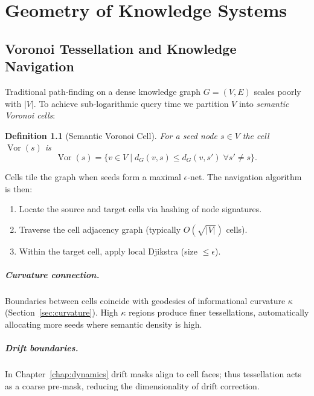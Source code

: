 
\newtheorem{definition}{Definition}[section]
\chapter{Geometry of Knowledge Systems}\label{chap:geometry}
\section{Voronoi Tessellation and Knowledge Navigation}\label{sec:tessellation}

Traditional path‑finding on a dense knowledge graph $G=(V,E)$ scales poorly with $|V|$.
To achieve sub‑logarithmic query time we partition $V$ into \emph{semantic Voronoi cells}:
\begin{definition}[Semantic Voronoi Cell]
For a seed node $s\in V$ the cell $\operatorname{Vor}(s)$ is
\[
  \operatorname{Vor}(s)=\{v\in V\mid d_G(v,s)\le d_G(v,s')\;\forall s'\neq s\}.\,
\]
\end{definition}
Cells tile the graph when seeds form a maximal $\epsilon$‑net.  The navigation algorithm is then:
\begin{enumerate}
  \item Locate the source and target cells via hashing of node signatures.
  \item Traverse the cell adjacency graph (typically \(O(\sqrt{|V|})\) cells).
  \item Within the target cell, apply local Djikstra (size $\le\epsilon$).
\end{enumerate}

\paragraph{Curvature connection.}  Boundaries between cells coincide with geodesics of
informational curvature $\kappa$ (Section~\ref{sec:curvature}).  High $\kappa$ regions
produce finer tessellations, automatically allocating more seeds where semantic density is high.

\paragraph{Drift boundaries.}  In Chapter~\ref{chap:dynamics} drift masks align to cell
faces; thus tessellation acts as a coarse pre‑mask, reducing the dimensionality of drift
correction.

